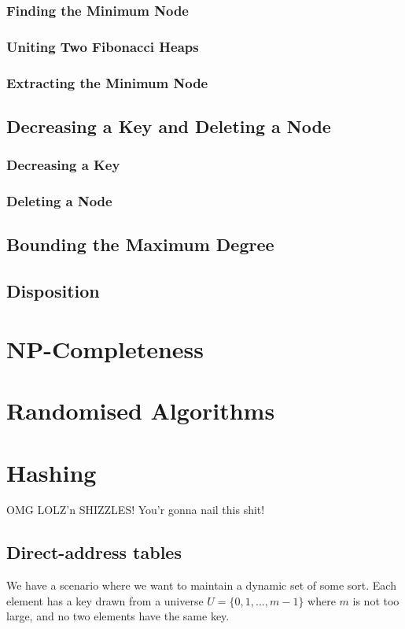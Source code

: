 \documentclass[12pt]{article}
\begin{document}
\subsubsection{Finding the Minimum Node}
\subsubsection{Uniting Two Fibonacci Heaps}
\subsubsection{Extracting the Minimum Node}

\subsection{Decreasing a Key and Deleting a Node}
\subsubsection{Decreasing a Key}
\subsubsection{Deleting a Node}

\subsection{Bounding the Maximum Degree}

\subsection{Disposition}
\newpage

\section{NP-Completeness}
\newpage

\section{Randomised Algorithms}
\newpage

\section{Hashing}
OMG LOLZ'n SHIZZLES! You'r gonna nail this shit!

\subsection{Direct-address tables}
We have a scenario where we want to maintain a dynamic set of some sort. Each element has a key drawn from a universe $U = \{0, 1, ..., m-1\}$ where $m$ is not too large, and no two elements have the same key. \\
\end{document}

